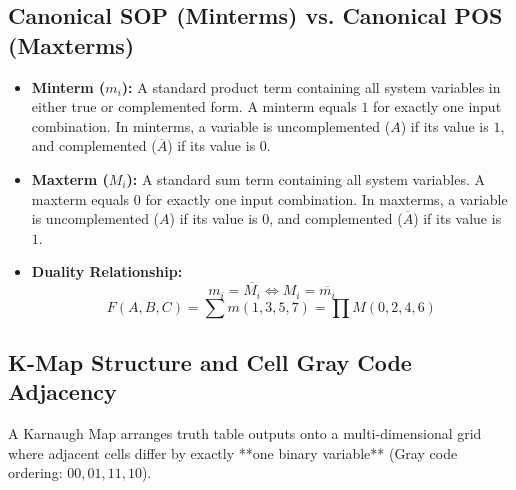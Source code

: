 \subsection{Canonical SOP (Minterms) vs. Canonical POS (Maxterms)}
\begin{itemize}
    \item \textbf{Minterm ($m_i$):} A standard product term containing all system variables in either true or complemented form. A minterm equals $1$ for exactly one input combination. In minterms, a variable is uncomplemented ($A$) if its value is $1$, and complemented ($\overline{A}$) if its value is $0$.
    \item \textbf{Maxterm ($M_i$):} A standard sum term containing all system variables. A maxterm equals $0$ for exactly one input combination. In maxterms, a variable is uncomplemented ($A$) if its value is $0$, and complemented ($\overline{A}$) if its value is $1$.
    \item \textbf{Duality Relationship:}
    \begin{equation}
        m_i = \overline{M_i} \iff M_i = \overline{m_i}
    \end{equation}
    \begin{equation}
        F(A,B,C) = \sum m(1, 3, 5, 7) = \prod M(0, 2, 4, 6)
    \end{equation}
\end{itemize}

\subsection{K-Map Structure and Cell Gray Code Adjacency}
A Karnaugh Map arranges truth table outputs onto a multi-dimensional grid where adjacent cells differ by exactly **one binary variable** (Gray code ordering: $00, 01, 11, 10$).

